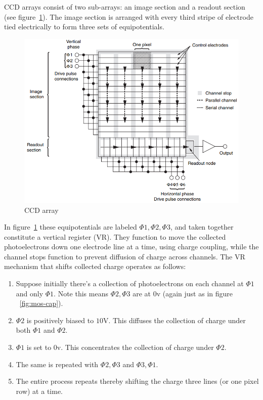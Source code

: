 CCD arrays consist of two sub-arrays: an image section and a readout section (see figure~\ref{fig:ccd-array}).
%
The image section is arranged with every third stripe of electrode tied electrically to form three sets of equipotentials.
\begin{figure}
    \includegraphics[width=\linewidth,keepaspectratio]{figures/ccd_array.png}
    \caption{CCD array\cite{pawley1995handbook}}
    \label{fig:ccd-array}
\end{figure}
%
In figure~\ref{fig:ccd-array} these equipotentials are labeled $\Phi1, \Phi2, \Phi3$, and taken together constitute a vertical register (VR).
%
They function to move the collected photoelectrons down one electrode line at a time, using charge coupling, while the channel stops function to prevent diffusion of charge across channels.
%
The VR mechanism that shifts collected charge operates as follows:
\begin{enumerate}
    \item Suppose initially there's a collection of photoelectrons on each channel at $\Phi1$ and only $\Phi1$. Note this means $\Phi2, \Phi3$ are at $0$v (again just as in figure ~\ref{fig:mos-cap}).
    \item $\Phi2$ is positively biased to $10$V. This diffuses the collection of charge under both $\Phi1$ and $\Phi2$.
    \item $\Phi1$ is set to $0$v. This concentrates the collection of charge under $\Phi2$.
    \item The same is repeated with $\Phi2, \Phi3$ and $\Phi3, \Phi1$.
    \item The entire process repeats thereby shifting the charge three lines (or one pixel row) at a time.
\end{enumerate}
